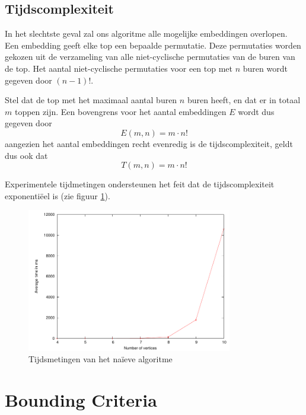 \documentclass{article}
\begin{document}
\subsection{Tijdscomplexiteit}
In het slechtste geval zal ons algoritme alle mogelijke embeddingen overlopen.
Een embedding geeft elke top een bepaalde permutatie. Deze permutaties worden
gekozen uit de verzameling van alle niet-cyclische permutaties van de buren
van de top. Het aantal niet-cyclische permutaties voor een top met $n$ buren
wordt gegeven door $(n-1)!$.
\newline

Stel dat de top met het maximaal aantal buren $n$ buren heeft, en dat er in
totaal $m$ toppen zijn. Een bovengrens voor het aantal embeddingen $E$ wordt dus
gegeven door
\begin{equation*}
E(m, n) = m \cdot n !
\end{equation*}
aangezien het aantal embeddingen recht evenredig is de tijdscomplexiteit, geldt
dus ook dat
\begin{equation*}
T(m, n) = m \cdot n !
\end{equation*}

Experimentele tijdmetingen ondersteunen het feit dat de tijdscomplexiteit
exponenti\"eel is (zie figuur \ref{fig:default}).

\begin{figure}
\begin{center}
\includegraphics[width=0.8\textwidth]{images/default.pdf}
\caption{Tijdsmetingen van het na\"ieve algoritme}
\label{fig:default}
\end{center}
\end{figure}

\section{Bounding Criteria}
\label{bounding-criteria}
\end{document}

